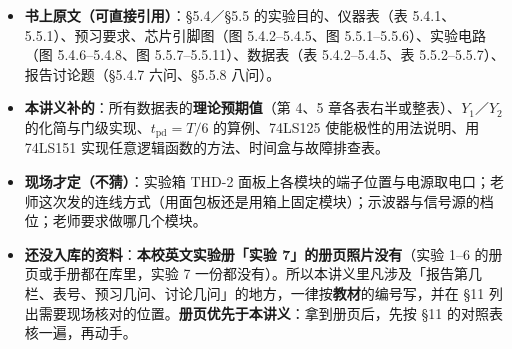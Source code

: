 \documentclass[11pt]{ctexart}
\let\origsubhdr\subhdr
\renewcommand{\subhdr}[1]{\needspace{3\baselineskip}\origsubhdr{#1}}
\begin{document}


\begin{itemize}
  \item \textbf{书上原文（可直接引用）}：§5.4／§5.5 的实验目的、仪器表（表 5.4.1、5.5.1）、预习要求、芯片引脚图（图 5.4.2--5.4.5、图 5.5.1--5.5.6）、实验电路（图 5.4.6--5.4.8、图 5.5.7--5.5.11）、数据表（表 5.4.2--5.4.5、表 5.5.2--5.5.7）、报告讨论题（§5.4.7 六问、§5.5.8 八问）。
  \item \textbf{本讲义补的}：所有数据表的\textbf{理论预期值}（第 4、5 章各表右半或整表）、$Y_1$／$Y_2$ 的化简与门级实现、$t_{\mathrm{pd}}=T/6$ 的算例、74LS125 使能极性的用法说明、用 74LS151 实现任意逻辑函数的方法、时间盒与故障排查表。
  \item \textbf{现场才定（不猜）}：实验箱 THD-2 面板上各模块的端子位置与电源取电口；老师这次发的连线方式（用面包板还是用箱上固定模块）；示波器与信号源的档位；老师要求做哪几个模块。
  \item \textbf{还没入库的资料}：\textbf{本校英文实验册「实验 7」的册页照片没有}（实验 1--6 的册页或手册都在库里，实验 7 一份都没有）。所以本讲义里凡涉及「报告第几栏、表号、预习几问、讨论几问」的地方，一律按\textbf{教材}的编号写，并在 §11 列出需要现场核对的位置。\textbf{册页优先于本讲义}：拿到册页后，先按 §11 的对照表核一遍，再动手。
\end{itemize}

\end{document}
